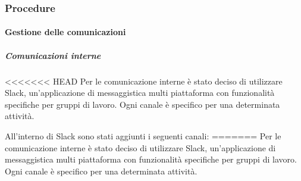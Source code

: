    		\subsubsection{Procedure}
   			\paragraph{Gestione delle comunicazioni}
   				\subparagraph{Comunicazioni interne}
<<<<<<< HEAD
   					Per le comunicazione interne è stato deciso di utilizzare  Slack, un'applicazione di messaggistica multi piattaforma con funzionalità specifiche per gruppi di lavoro. Ogni canale è specifico per una determinata attività.
   				
   					All'interno di Slack sono stati aggiunti i seguenti canali:
=======
   					Per le comunicazione interne è stato deciso di utilizzare  Slack\glos, un'applicazione di messaggistica multi piattaforma con funzionalità specifiche per gruppi di lavoro. Ogni canale è specifico per una determinata attività.

